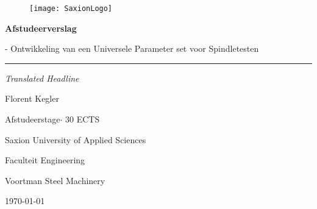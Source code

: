 \newcommand{\thesisAuthor}{Florent Kegler \newline 514277}
\newcommand{\thesisTitle}{Afstudeerverslag}
\newcommand{\thesisSubTitle}{Ontwikkeling van een Universele Parameter set voor Spindletesten}
\newcommand{\thesisTitleTranslated}{Translated Headline}
\newcommand{\thesisDegree}{Afstudeerstage}
\newcommand{\university}{Saxion University of Applied Sciences}
\newcommand{\credits}{30 ECTS}
\newcommand{\faculty}{Faculteit Engineering}
\newcommand{\thesisPlaceDate}{\today}
\newcommand{\company}{Voortman Steel Machinery}

\begin{titlepage}
	
	\thispagestyle{empty}
	\myfont
	
	\begin{figure}
		\vspace{-3cm}
		\centering
		
		\begin{minipage}[t]{.45\linewidth}
			\vspace{1cm}
			\raggedleft
			\hspace*{1cm}\texttt{[image: SaxionLogo]}\hspace*{-5cm}
		\end{minipage}
	\end{figure}
	
	\vspace{3cm}
	\par
	\noindent
	\Huge
	\textbf{\thesisTitle}
	\vspace{0.2cm}
	\small
	\par
	\noindent
	- \thesisSubTitle\\
	\rule[0.3cm]{\linewidth}{2pt}
	\Large
	
	\noindent
	\textit{\thesisTitleTranslated}
	
	\vspace{2cm}
	\noindent
	\LARGE
	\thesisAuthor\\
	\vspace{4 cm}
	\small
	\par \noindent
	\thesisDegree $\cdot$ \credits
	\par \noindent
	\university
	\par \noindent
	\faculty
	\par \noindent
	\company
	\par \noindent
	\thesisPlaceDate
	
	
	
\end{titlepage}